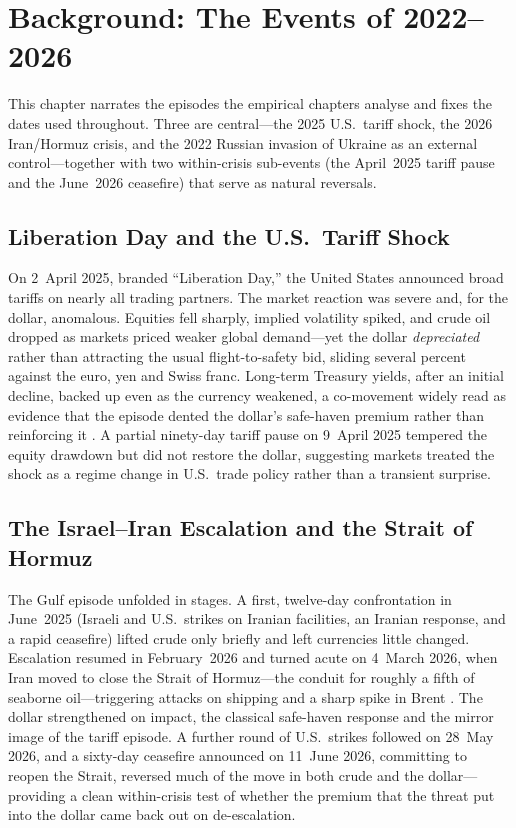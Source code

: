 
\chapter{Background: The Events of 2022--2026}
\label{ch:background}

This chapter narrates the episodes the empirical chapters analyse and fixes the dates used
throughout. Three are central---the 2025 U.S.\ tariff shock, the 2026 Iran/Hormuz crisis,
and the 2022 Russian invasion of Ukraine as an external control---together with two
within-crisis sub-events (the April~2025 tariff pause and the June~2026 ceasefire) that
serve as natural reversals.

\section{Liberation Day and the U.S.\ Tariff Shock}
\label{sec:bg_tariff}

On 2~April 2025, branded ``Liberation Day,'' the United States announced broad tariffs on
nearly all trading partners. The market reaction was severe and, for the dollar,
anomalous. Equities fell sharply, implied volatility spiked, and crude oil dropped as
markets priced weaker global demand---yet the dollar \emph{depreciated} rather than
attracting the usual flight-to-safety bid, sliding several percent against the euro, yen and
Swiss franc. Long-term Treasury yields, after an initial decline, backed up even as the
currency weakened, a co-movement widely read as evidence that the episode dented the
dollar's safe-haven premium rather than reinforcing it \parencite{corsetti2025,ecb2025fsr}.
A partial ninety-day tariff pause on 9~April 2025 tempered the equity drawdown but did not
restore the dollar, suggesting markets treated the shock as a regime change in U.S.\
trade policy rather than a transient surprise.

\section{The Israel--Iran Escalation and the Strait of Hormuz}
\label{sec:bg_iran}

The Gulf episode unfolded in stages. A first, twelve-day confrontation in June~2025
(Israeli and U.S.\ strikes on Iranian facilities, an Iranian response, and a rapid
ceasefire) lifted crude only briefly and left currencies little changed. Escalation resumed
in February~2026 and turned acute on 4~March 2026, when Iran moved to close the Strait of
Hormuz---the conduit for roughly a fifth of seaborne oil---triggering attacks on shipping
and a sharp spike in Brent \parencite{fattouh2026,kilian2026}. The dollar strengthened on
impact, the classical safe-haven response and the mirror image of the tariff episode. A
further round of U.S.\ strikes followed on 28~May 2026, and a sixty-day ceasefire announced
on 11~June 2026, committing to reopen the Strait, reversed much of the move in both crude and
the dollar---providing a clean within-crisis test of whether the premium that the threat put
into the dollar came back out on de-escalation.

